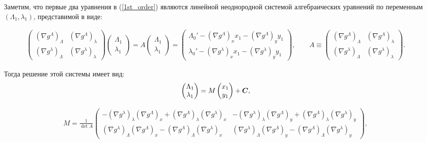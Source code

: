 \begin{enumerate}
Заметим, что первые два уравнения в (\ref{1st_order}) являются линейной неоднородной системой алгебраических уравнений по переменным $(\Lambda_1, \lambda_1)$, представимой в виде:

\begin{align*}
\begin{pmatrix}
(\nabla g^\Lambda)_\Lambda & (\nabla g^\Lambda)_\lambda \\
(\nabla g^\lambda)_\Lambda & (\nabla g^\lambda)_\lambda
\end{pmatrix}
\begin{pmatrix} \Lambda_1 \\ \lambda_1 \end{pmatrix}
= A \begin{pmatrix} \Lambda_1 \\ \lambda_1 \end{pmatrix} =
\begin{pmatrix} \Lambda_0' - (\nabla g^\Lambda)_x x_1 - (\nabla g^\Lambda)_y y_1 \\ \lambda_0' - (\nabla g^\lambda)_x x_1 - (\nabla g^\lambda)_y y_1 \end{pmatrix}, \qquad
A \equiv \begin{pmatrix}
(\nabla g^\Lambda)_\Lambda & (\nabla g^\Lambda)_\lambda \\
(\nabla g^\lambda)_\Lambda & (\nabla g^\lambda)_\lambda
\end{pmatrix}.
\end{align*}

Тогда решение этой системы имеет вид:
\begin{align*}
    \begin{pmatrix} \Lambda_1 \\ \lambda_1 \end{pmatrix} = 
    M \begin{pmatrix} x_1 \\ y_1 \end{pmatrix} + \boldsymbol{C},
\end{align*}

\begin{align*}
    M = \frac{1}{\det A} \begin{pmatrix} 
        -(\nabla g^\lambda)_\lambda (\nabla g^\Lambda)_x + (\nabla g^\Lambda)_\lambda (\nabla g^\lambda)_x & -(\nabla g^\lambda)_\lambda (\nabla g^\Lambda)_y + (\nabla g^\Lambda)_\lambda (\nabla g^\lambda)_y \\ 
         (\nabla g^\lambda)_\Lambda (\nabla g^\Lambda)_x - (\nabla g^\Lambda)_\Lambda (\nabla g^\lambda)_x &  (\nabla g^\lambda)_\Lambda (\nabla g^\Lambda)_y - (\nabla g^\Lambda)_\Lambda (\nabla g^\lambda)_y
    \end{pmatrix},
\end{align*}


\end{enumerate}
